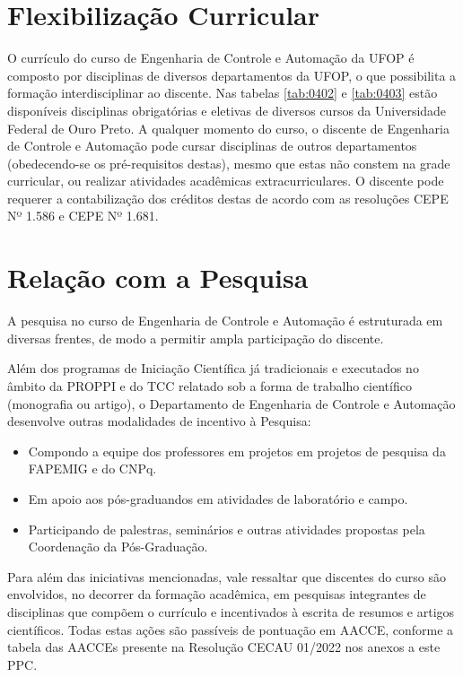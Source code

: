 \documentclass[
	12pt,				%
	openright,			%
	oneside,			%
	a4paper,			%
	english,			%
	brazil				%
	]{abntex2}
\begin{document}
\section{Flexibilização Curricular}
O currículo do curso de Engenharia de Controle e Automação da UFOP é composto por disciplinas de diversos departamentos da UFOP, o que possibilita a formação interdisciplinar ao discente. Nas tabelas \ref{tab:0402} e \ref{tab:0403} estão disponíveis disciplinas obrigatórias e eletivas de diversos cursos da Universidade Federal de Ouro Preto. A qualquer momento do curso, o discente de Engenharia de Controle e Automação pode cursar disciplinas de outros departamentos (obedecendo-se os pré-requisitos destas), mesmo que estas não constem na grade curricular, ou realizar atividades acadêmicas extracurriculares. O discente pode requerer a contabilização dos créditos destas de acordo com as resoluções CEPE  Nº  1.586 e CEPE  Nº  1.681.

\section{Relação com a Pesquisa}

A pesquisa no curso de Engenharia de Controle e Automação é estruturada em diversas frentes, de modo a permitir ampla participação do discente.

Além dos programas de Iniciação Científica já tradicionais e executados no âmbito da PROPPI e do TCC relatado sob a forma de trabalho científico (monografia ou artigo), o Departamento de Engenharia de Controle e Automação desenvolve outras modalidades de incentivo à Pesquisa:

\begin{itemize}
    \item Compondo a equipe dos professores em projetos em projetos de pesquisa da FAPEMIG e do CNPq.
    \item Em apoio aos pós-graduandos em atividades de laboratório e campo.
    \item Participando de palestras, seminários e outras atividades propostas pela Coordenação da Pós-Graduação.
\end{itemize}

Para além das iniciativas mencionadas, vale ressaltar que discentes do curso são envolvidos, no decorrer da formação acadêmica, em pesquisas integrantes de disciplinas que compõem o currículo e incentivados à escrita de resumos e artigos científicos. Todas estas ações são passíveis de pontuação em AACCE, conforme a tabela das AACCEs presente na Resolução CECAU 01/2022 nos anexos a este PPC.
\end{document}
